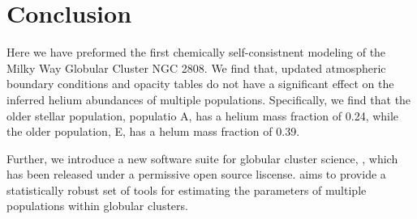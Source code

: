 \section{Conclusion}\label{sec:conclusion}
Here we have preformed the first chemically self-consistnent modeling of the
Milky Way Globular Cluster NGC 2808. We find that, updated atmospheric boundary
conditions and opacity tables do not have a significant effect on the inferred
helium abundances of multiple populations. Specifically, we find that the older
stellar population, populatio A, has a helium mass fraction of 0.24, while the
older population, E, has a helum mass fraction of 0.39.

Further, we introduce a new software suite for globular cluster science,
\fidanka, which has been released under a permissive open source liscense.
\fidanka aims to provide a statistically robust set of tools for estimating the
parameters of multiple populations within globular clusters.
